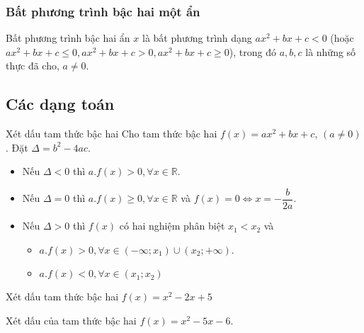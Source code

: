 \subsubsection{Bất phương trình bậc hai một ẩn}
\begin{dn}
	Bất phương trình bậc hai ẩn $x$ là bất phương trình dạng $ax^2+bx+c<0$ (hoặc $ax^2+bx+c\le 0, ax^2+bx+c>0, ax^2+bx+c\ge 0$), trong đó $a,b,c$ là những số thực đã cho, $a\ne 0$.
\end{dn}



\subsection{Các dạng toán}

\begin{dang}{Xét dấu tam thức bậc hai}
	Cho tam thức bậc hai $f(x)=ax^2+bx+c$, $(a\ne 0)$. Đặt $\Delta =b^2-4ac$.
	\begin{itemize}
		\item Nếu $\Delta <0$ thì $a.f(x)>0, \forall x\in \mathbb{R}$.
		\item Nếu $\Delta =0$ thì $a.f(x)\ge 0, \forall x\in \mathbb{R}$ và $f(x) =0\Leftrightarrow x=-\dfrac{b}{2a}$.
		\item Nếu $\Delta >0$ thì $f(x)$ có hai nghiệm phân biệt $x_1<x_2$ và
		\begin{itemize}
			\item $a.f(x)>0, \forall x\in (-\infty; x_1)\cup (x_2; +\infty)$.
			\item $a.f(x)<0, \forall x\in (x_1; x_2)$
		\end{itemize}
	\end{itemize}
	
\end{dang}

\begin{vd}%
	Xét dấu tam thức bậc hai $f(x)=x^2-2x+5$
\end{vd}

\begin{vd}%
	Xét dấu của tam thức bậc hai $f(x)= x^2-5x-6$.
\end{vd}



